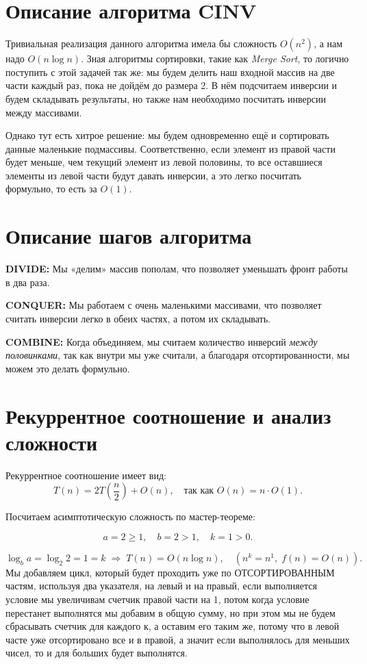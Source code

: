 \documentclass[12pt]{article}
\begin{document}
\section*{Описание алгоритма CINV}

Тривиальная реализация данного алгоритма имела бы сложность $O(n^2)$, а нам надо $O(n \log n)$.  
Зная алгоритмы сортировки, такие как \textit{Merge Sort}, то логично поступить с этой задачей так же:  
мы будем делить наш входной массив на две части каждый раз, пока не дойдём до размера 2.  
В нём подсчитаем инверсии и будем складывать результаты, но также нам необходимо посчитать инверсии между массивами.  

Однако тут есть хитрое решение:  
мы будем одновременно ещё и сортировать данные маленькие подмассивы.  
Соответственно, если элемент из правой части будет меньше, чем текущий элемент из левой половины,  
то все оставшиеся элементы из левой части будут давать инверсии,  
а это легко посчитать формульно, то есть за $O(1)$.

\bigskip

\section*{Описание шагов алгоритма}

\textbf{DIVIDE:} Мы «делим» массив пополам, что позволяет уменьшать фронт работы в два раза.  

\textbf{CONQUER:} Мы работаем с очень маленькими массивами, что позволяет считать инверсии легко в обеих частях, а потом их складывать.  

\textbf{COMBINE:} Когда объединяем, мы считаем количество инверсий \textit{между половинками}, так как внутри мы уже считали,  
а благодаря отсортированности, мы можем это делать формульно.

\bigskip

\section*{Рекуррентное соотношение и анализ сложности}

Рекуррентное соотношение имеет вид:
\[
T(n) = 2T\left(\frac{n}{2}\right) + O(n), \quad \text{так как } O(n) = n \cdot O(1).
\]

Посчитаем асимптотическую сложность по мастер-теореме:

\[
a = 2 \ge 1, \quad b = 2 > 1, \quad k = 1 > 0.
\]

\[
\log_b a = \log_2 2 = 1 = k \;\Rightarrow\; T(n) = O(n \log n), 
\quad (n^k = n^1, \; f(n) = O(n)).
\]
Мы добавляем цикл, который будет проходить уже по ОТСОРТИРОВАННЫМ частям, используя два указателя, на левый и на правый, если выполняется условие мы увеличивам счетчик правой части на 1, потом когда условие перестанет выполнятся мы добавим в общую сумму, но при этом мы не будем сбрасывать счетчик для каждого к, а оставим его таким же, потому что в левой часте уже отсортировано все и в правой, а значит если выполнялось для меньших чисел, то и для больших будет выполнятся.
\end{document}
